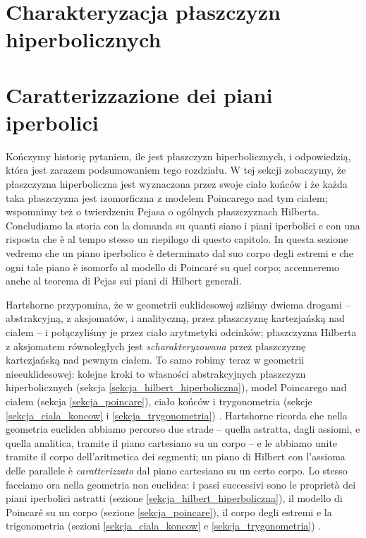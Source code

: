 \section{Charakteryzacja płaszczyzn hiperbolicznych} %
\section{Caratterizzazione dei piani iperbolici} %
\label{sekcja_charakteryzacja}

Kończymy historię pytaniem, ile jest płaszczyzn hiperbolicznych, i odpowiedzią, która jest zarazem podsumowaniem tego rozdziału. %
W tej sekcji zobaczymy, że płaszczyzna hiperboliczna jest wyznaczona przez swoje ciało końców i że każda taka płaszczyzna jest izomorficzna z modelem Poincarego nad tym ciałem; wspomnimy też o twierdzeniu Pejasa o ogólnych płaszczyznach Hilberta. %
Concludiamo la storia con la domanda su quanti siano i piani iperbolici e con una risposta che è al tempo stesso un riepilogo di questo capitolo. %
In questa sezione vedremo che un piano iperbolico è determinato dal suo corpo degli estremi e che ogni tale piano è isomorfo al modello di Poincaré su quel corpo; accenneremo anche al teorema di Pejas sui piani di Hilbert generali. %

Hartshorne \cite[s. 415]{hartshorne_2000} przypomina, że w geometrii euklidesowej szliśmy dwiema drogami -- abstrakcyjną, z aksjomatów, i analityczną, przez płaszczyznę kartezjańską nad ciałem -- i połączyliśmy je przez ciało arytmetyki odcinków; płaszczyzna Hilberta z aksjomatem równoległych jest \emph{scharakteryzowana} przez płaszczyznę kartezjańską nad pewnym ciałem. %
To samo robimy teraz w geometrii nieeuklidesowej: kolejne kroki to własności abstrakcyjnych płaszczyzn hiperbolicznych (sekcja \ref{sekcja_hilbert_hiperboliczna}), model Poincarego nad ciałem (sekcja \ref{sekcja_poincare}), ciało końców i trygonometria (sekcje \ref{sekcja_ciala_koncow} i \ref{sekcja_trygonometria}) \cite[s. 416]{hartshorne_2000}. %
Hartshorne \cite[p. 415]{hartshorne_2000} ricorda che nella geometria euclidea abbiamo percorso due strade -- quella astratta, dagli assiomi, e quella analitica, tramite il piano cartesiano su un corpo -- e le abbiamo unite tramite il corpo dell'aritmetica dei segmenti; un piano di Hilbert con l'assioma delle parallele è \emph{caratterizzato} dal piano cartesiano su un certo corpo. %
Lo stesso facciamo ora nella geometria non euclidea: i passi successivi sono le proprietà dei piani iperbolici astratti (sezione \ref{sekcja_hilbert_hiperboliczna}), il modello di Poincaré su un corpo (sezione \ref{sekcja_poincare}), il corpo degli estremi e la trigonometria (sezioni \ref{sekcja_ciala_koncow} e \ref{sekcja_trygonometria}) \cite[p. 416]{hartshorne_2000}. %

